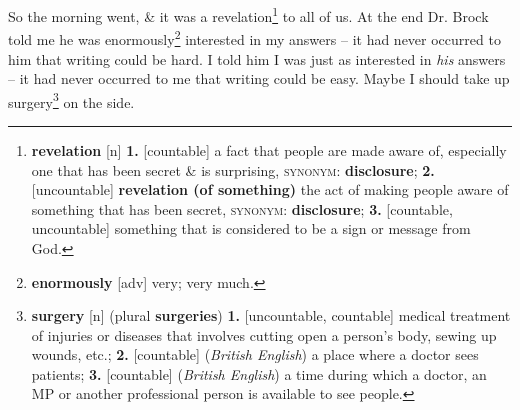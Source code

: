 \documentclass[oneside]{book}
\numberwithin{equation}{section}
\begin{document}
So the morning went, \& it was a revelation\footnote{\textbf{revelation} [n] \textbf{1.} [countable] a fact that people are made aware of, especially one that has been secret \& is surprising, \textsc{synonym}: \textbf{disclosure}; \textbf{2.} [uncountable] \textbf{revelation (of something)} the act of making people aware of something that has been secret, \textsc{synonym}: \textbf{disclosure}; \textbf{3.} [countable, uncountable] something that is considered to be a sign or message from God.} to all of us. At the end Dr. Brock told me he was enormously\footnote{\textbf{enormously} [adv] very; very much.} interested in my answers -- it had never occurred to him that writing could be hard. I told him I was just as interested in \textit{his} answers -- it had never occurred to me that writing could be easy. Maybe I should take up surgery\footnote{\textbf{surgery} [n] (plural \textbf{surgeries}) \textbf{1.} [uncountable, countable] medical treatment of injuries or diseases that involves cutting open a person's body, sewing up wounds, etc.; \textbf{2.} [countable] (\textit{British English}) a place where a doctor sees patients; \textbf{3.} [countable] (\textit{British English}) a time during which a doctor, an MP or another professional person is available to see people.} on the side.
\end{document}
